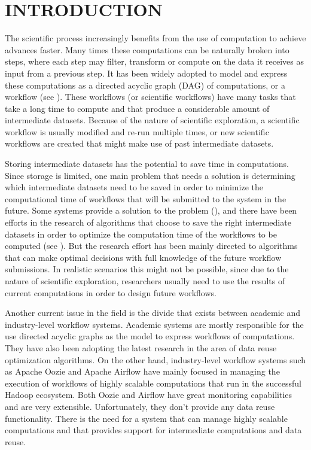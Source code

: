 \chapter{INTRODUCTION}
\label{chap:introduction}
The scientific process increasingly benefits from the use of computation to achieve advances faster. Many times these computations can be naturally broken into steps, where each step may filter, transform or compute on the data it receives as input from a previous step.  It has been widely adopted to model and express these computations as a directed acyclic graph (DAG) of computations, or a workflow (see \cite{liu2015survey}).  These workflows (or scientific workflows) have many tasks that take a long time to compute and that produce a considerable amount of intermediate datasets.  Because of the nature of scientific exploration, a scientific workflow is usually modified and re-run multiple times, or new scientific workflows are created that might make use of past intermediate datasets.  

Storing intermediate datasets has the potential to save time in computations. Since storage is limited, one main problem that needs a solution is determining which intermediate datasets need to be saved in order to minimize the computational time of workflows that will be submitted to the system in the future. Some systems provide a solution to the problem (\cite{yuan2012data}), and there have been efforts in the research of algorithms that choose to save the right intermediate datasets in order to optimize the computation time of the workflows to be computed (see \cite{bazzi}). But the research effort has been mainly directed to algorithms that can make optimal decisions with full knowledge of the future workflow submissions.  In realistic scenarios this might not be possible, since due to the nature of scientific exploration, researchers usually need to use the results of current computations in order to design future workflows.

Another current issue in the field is the divide that exists between academic and industry-level workflow systems.  Academic systems are mostly responsible for the use directed acyclic graphs as the model to express workflows of computations.  They have also been adopting the latest research in the area of data reuse optimization algorithms.  On the other hand, industry-level workflow systems such as Apache Oozie and Apache Airflow have mainly focused in managing the execution of workflows of highly scalable computations that run in the successful Hadoop ecosystem. Both Oozie and Airflow have great monitoring capabilities and are very extensible. Unfortunately, they don't provide any data reuse functionality.  There is the need for a system that can manage highly scalable computations and that provides support for intermediate computations and data reuse.

